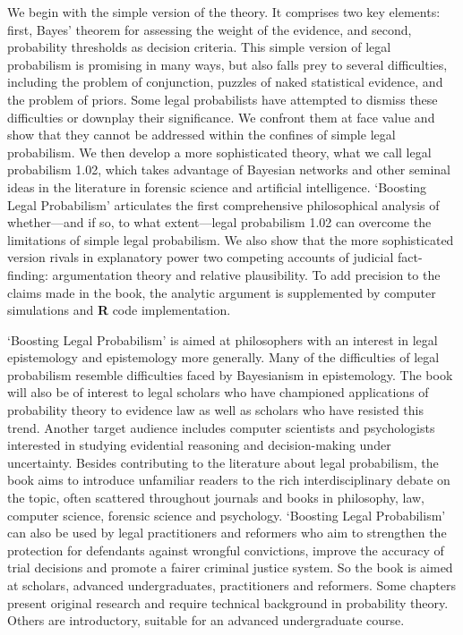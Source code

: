 \documentclass[
  10pt,
  dvipsnames,enabledeprecatedfontcommands]{scrartcl}
\begin{document}
We begin with the simple version of the theory. It comprises two key
elements: first, Bayes' theorem for assessing the weight of the
evidence, and second, probability thresholds as decision criteria. This
simple version of legal probabilism is promising in many ways, but also
falls prey to several difficulties, including the problem of
conjunction, puzzles of naked statistical evidence, and the problem of
priors. Some legal probabilists have attempted to dismiss these
difficulties or downplay their significance. We confront them at face
value and show that they cannot be addressed within the confines of
simple legal probabilism. We then develop a more sophisticated theory,
what we call legal probabilism 1.02, which takes advantage of Bayesian
networks and other seminal ideas in the literature in forensic science
and artificial intelligence. `Boosting Legal Probabilism' articulates
the first comprehensive philosophical analysis of whether---and if so,
to what extent---legal probabilism 1.02 can overcome the limitations of
simple legal probabilism. We also show that the more sophisticated
version rivals in explanatory power two competing accounts of judicial
fact-finding: argumentation theory and relative plausibility. To add
precision to the claims made in the book, the analytic argument is
supplemented by computer simulations and \textbf{\textsf{R}} code
implementation.

`Boosting Legal Probabilism' is aimed at philosophers with an interest
in legal epistemology and epistemology more generally. Many of the
difficulties of legal probabilism resemble difficulties faced by
Bayesianism in epistemology. The book will also be of interest to legal
scholars who have championed applications of probability theory to
evidence law as well as scholars who have resisted this trend. Another
target audience includes computer scientists and psychologists
interested in studying evidential reasoning and decision-making under
uncertainty. Besides contributing to the literature about legal
probabilism, the book aims to introduce unfamiliar readers to the rich
interdisciplinary debate on the topic, often scattered throughout
journals and books in philosophy, law, computer science, forensic
science and psychology. `Boosting Legal Probabilism' can also be used by
legal practitioners and reformers who aim to strengthen the protection
for defendants against wrongful convictions, improve the accuracy of
trial decisions and promote a fairer criminal justice system. So the
book is aimed at scholars, advanced undergraduates, practitioners and
reformers. Some chapters present original research and require technical
background in probability theory. Others are introductory, suitable for
an advanced undergraduate course.
\end{document}
